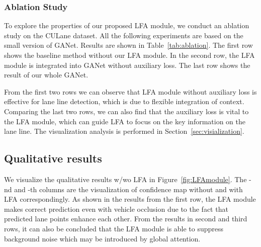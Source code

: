 \documentclass[10pt,twocolumn,letterpaper]{article}
\begin{document}
\subsubsection{Ablation Study}
To explore the properties of our proposed LFA module, we conduct an ablation study on the CULane dataset. All the following experiments are based on the small version of GANet. Results are shown in Table~\ref{tab:ablation}.
The first row shows the baseline method without our LFA module.
In the second row, the LFA module is integrated into GANet without auxiliary loss.
The last row shows the result of our whole GANet.

From the first two rows we can observe that LFA module without auxiliary loss is effective for lane line detection, which is due to flexible integration of context.
Comparing the last two rows, we can also find that the auxiliary loss is vital to the LFA module, which can guide LFA to focus on the key information on the lane line. The visualization analysis is performed in Section~\ref{sec:visialization}.

\begin{table}[!htbp]
    \centering
    \caption{Ablation study of LFA module}
    \label{tab:ablation}
\end{table}

\subsection{Qualitative results\label{sec:visialization}}
We visualize the qualitative results w/wo LFA in Figure~\ref{fig:LFAmodule}. The -nd and -th columns are the visualization of confidence map without and with LFA correspondingly. 
As shown in the results from the first row, the LFA module makes correct prediction even with vehicle occlusion due to the fact that predicted lane points enhance each other.
From the results in second and third rows, it can also be concluded that the LFA module is able to suppress background noise which may be introduced by global attention.
\end{document}
